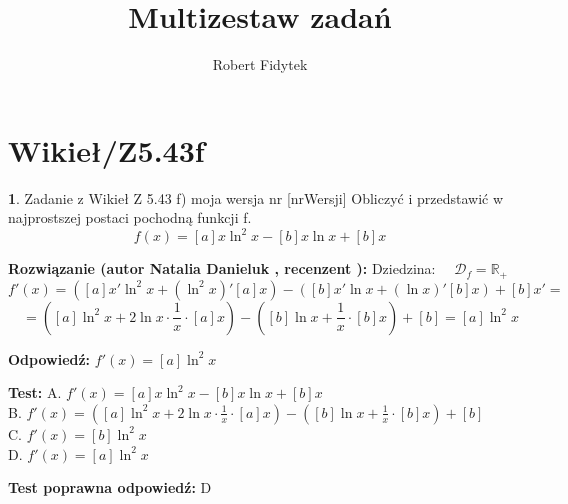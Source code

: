 \documentclass[12pt, a4paper]{article}
\title{Multizestaw zadań}
\author{Robert Fidytek}
\date{}
\theoremstyle{definition} %
\newtheorem{zad}{}
\newcommand{\kategoria}[1]{\section{#1}} %
\newcommand{\zadStart}[1]{\begin{zad}#1\newline} %
\newcommand{\zadStop}{\end{zad}}   %
\newcommand{\rozwStart}[2]{\noindent \textbf{Rozwiązanie (autor #1 , recenzent #2): }\newline} %
\newcommand{\rozwStop}{\newline}                                            %
\newcommand{\odpStart}{\noindent \textbf{Odpowiedź:}\newline}    %
\newcommand{\odpStop}{\newline}                                             %
\newcommand{\testStart}{\noindent \textbf{Test:}\newline} %
\newcommand{\testStop}{\newline} %
\newcommand{\kluczStart}{\noindent \textbf{Test poprawna odpowiedź:}\newline} %
\newcommand{\kluczStop}{\newline} %
\begin{document}
\maketitle

\kategoria{Wikieł/Z5.43f}

\zadStart{Zadanie z Wikieł Z 5.43 f) moja wersja nr [nrWersji]}
Obliczyć i przedstawić w najprostszej postaci pochodną funkcji f.
$$f(x) = [a]x\ln^2x - [b]x\ln x+[b]x$$
\zadStop

\rozwStart{Natalia Danieluk}{}
Dziedzina: $\quad \mathcal{D}_f=\mathbb{R_+}$
$$f'(x) = ([a]x'\ln^2x + (\ln^2x)'[a]x) - ([b]x'\ln x + (\ln x)'[b]x) + [b]x' = $$
$$\quad= ([a]\ln^2x + 2\ln x \cdot \frac{1}{x} \cdot [a]x) - ([b]\ln x + \frac{1}{x} \cdot [b]x) + [b] = [a]\ln^2x$$
\rozwStop

\odpStart
$f'(x) = [a]\ln^2x$
\odpStop

\testStart
A. $f'(x) = [a]x\ln^2x - [b]x\ln x+[b]x$\\
B. $f'(x) = ([a]\ln^2x + 2\ln x \cdot \frac{1}{x} \cdot [a]x) - ([b]\ln x + \frac{1}{x} \cdot [b]x) + [b]$\\
C. $f'(x) = [b]\ln^2x$\\
D. $f'(x) = [a]\ln^2x$
\testStop

\kluczStart
D
\kluczStop
\end{document}
